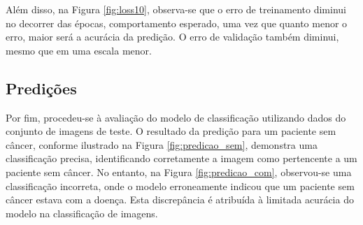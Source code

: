 Além disso, na Figura \ref{fig:loss10}, observa-se que o erro de treinamento diminui no decorrer das épocas, comportamento esperado, uma vez que quanto menor o erro, maior será a acurácia da predição. O erro de validação também diminui, mesmo que em uma escala menor.



\subsection{\esp Predições} \label{pred}

Por fim, procedeu-se à avaliação do modelo de classificação utilizando dados do conjunto de imagens de teste. O resultado da predição para um paciente sem câncer, conforme ilustrado na Figura \ref{fig:predicao_sem}, demonstra uma classificação precisa, identificando corretamente a imagem como pertencente a um paciente sem câncer. No entanto, na Figura \ref{fig:predicao_com}, observou-se uma classificação incorreta, onde o modelo erroneamente indicou que um paciente sem câncer estava com a doença. Esta discrepância é atribuída à limitada acurácia do modelo na classificação de imagens.

